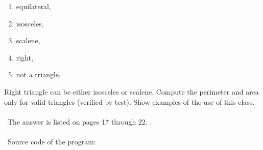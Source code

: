 \documentclass{article}
\begin{document}
\begin{enumerate}[label=(\arabic*)]
	\item equilateral,
	\item isosceles,
	\item scalene,
	\item right,
	\item not a triangle.
\end{enumerate}

Right triangle can be either isosceles or scalene. Compute the perimeter and area only for valid triangles (verified by test). Show examples of the use of this class.

\paragraph{}\
	The answer is listed on pages 17 through 22.
\paragraph{}\
Source code of the program:
\end{document}
